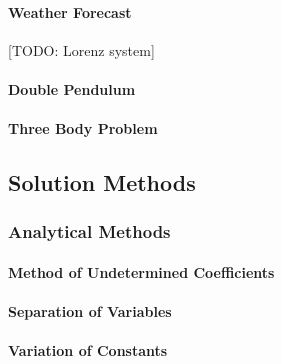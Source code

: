 \paragraph{Weather Forecast} [TODO: Lorenz system]

\paragraph{Double Pendulum}

\paragraph{Three Body Problem}



\subsection{Solution Methods}

\subsubsection{Analytical Methods}


\paragraph{Method of Undetermined Coefficients}


\paragraph{Separation of Variables}

\paragraph{Variation of Constants}

